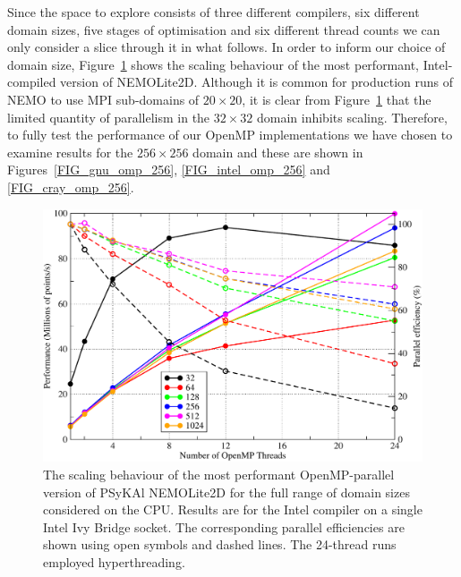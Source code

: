 \documentclass[gmdd, manuscript]{copernicus}
\newlength{\picwidth}
\begin{document}
Since the space to explore consists of three different compilers, six
different domain sizes, five stages of optimisation and six different
thread counts we can only consider a slice through it in what follows.
In order to inform our choice of domain size,
Figure~\ref{FIG_omp_domain_size} shows the scaling behaviour of the
most performant, Intel-compiled version of NEMOLite2D. Although it is
common for production runs of NEMO to use MPI sub-domains of $20
\times 20$, it is clear from Figure~\ref{FIG_omp_domain_size} that the
limited quantity of parallelism in the $32 \times 32$ domain inhibits
scaling. Therefore, to fully test the performance of our OpenMP
implementations we have chosen to examine results for the $256 \times
256$ domain and these are shown in Figures~\ref{FIG_gnu_omp_256},
\ref{FIG_intel_omp_256} and \ref{FIG_cray_omp_256}.

\begin{figure}
\centering
\includegraphics[width=\picwidth]{omp_scaling_problem_size}
\caption{The scaling behaviour of the most performant OpenMP-parallel
  version of {PS}y{KA}l NEMOLite2D for the full range of domain sizes
  considered on the CPU. Results are for the Intel compiler on a
  single Intel Ivy Bridge socket. The corresponding parallel
  efficiencies are shown using open symbols and dashed lines. The
  24-thread runs employed hyperthreading.}
\label{FIG_omp_domain_size}
\end{figure}
\end{document}
